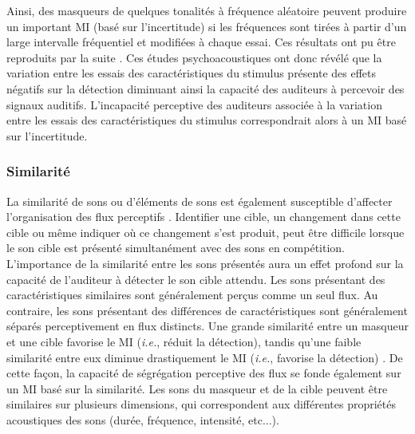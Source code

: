 Ainsi, des masqueurs de quelques tonalités à fréquence aléatoire peuvent produire un important MI (basé sur l'incertitude) si les fréquences sont tirées à partir d’un large intervalle fréquentiel et modifiées à chaque essai. 
Ces résultats ont pu être reproduits par la suite \citep{neff1988effective, neff1993informational, oh1998nonmonotonicity}.
Ces études psychoacoustiques ont donc révélé que la variation entre les essais des caractéristiques du stimulus présente des effets négatifs sur la détection diminuant ainsi la capacité des auditeurs à percevoir des signaux auditifs. 
L'incapacité perceptive des auditeurs associée à la variation entre les essais des caractéristiques du stimulus correspondrait alors à un MI basé sur l'incertitude. 

\subsubsection{Similarité}
\label{masquageinformationnelsimilarité}

La similarité de sons ou d'éléments de sons est également susceptible d'affecter l'organisation des flux perceptifs \citep{dickerson2014did, kidd2002similarity, lee2011evaluation}. 
Identifier une cible, un changement dans cette cible ou même indiquer où ce changement s'est produit, peut être difficile lorsque le son cible est présenté simultanément avec des sons en compétition. 
L'importance de la similarité entre les sons présentés aura un effet profond sur la capacité de l'auditeur à détecter le son cible attendu. 
Les sons présentant des caractéristiques similaires sont généralement perçus comme un seul flux. 
Au contraire, les sons présentant des différences de caractéristiques sont généralement séparés perceptivement en flux distincts. 
Une grande similarité entre un masqueur et une cible favorise le MI (\textit{i.e.}, réduit la détection), tandis qu'une faible similarité entre eux diminue drastiquement le MI (\textit{i.e.}, favorise la détection) \citep{watson2005some}. 
De cette façon, la capacité de ségrégation perceptive des flux se fonde également sur un MI basé sur la similarité. 
Les sons du masqueur et de la cible peuvent être similaires sur plusieurs dimensions, qui correspondent aux différentes propriétés acoustiques des sons (durée, fréquence, intensité, etc...). 

